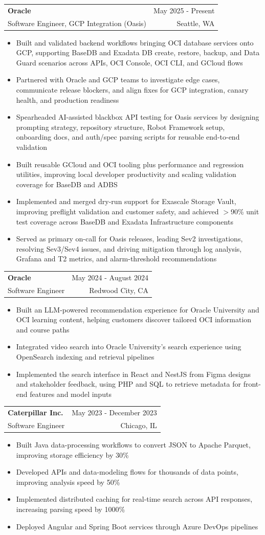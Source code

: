 \documentclass[letterpaper,11pt]{article}
\makeatletter
\newcommand{\resumeItem}[1]{
  \item\small{
    {#1 \vspace{-2pt}}
  }
}
\newcommand{\resumeSubheading}[4]{
  \vspace{-2pt}\item
    \begin{tabular*}{0.97\textwidth}[t]{l@{\extracolsep{\fill}}r}
      \textbf{#1} & #2 \\
      {\small#3} & {\small #4} \\
    \end{tabular*}\vspace{-7pt}
}
\newcommand{\resumeItemListStart}{\begin{itemize}}
\newcommand{\resumeItemListEnd}{\end{itemize}\vspace{-5pt}}
\makeatother
\begin{document}
    \resumeSubheading
  {Oracle}{May 2025 - Present}
  {Software Engineer, GCP Integration (Oasis)}{Seattle, WA}
  \resumeItemListStart
    \resumeItem{Built and validated backend workflows bringing OCI database services onto GCP, supporting BaseDB and Exadata DB create, restore, backup, and Data Guard scenarios across APIs, OCI Console, OCI CLI, and GCloud flows}
    \resumeItem{Partnered with Oracle and GCP teams to investigate edge cases, communicate release blockers, and align fixes for GCP integration, canary health, and production readiness}
    \resumeItem{Spearheaded AI-assisted blackbox API testing for Oasis services by designing prompting strategy, repository structure, Robot Framework setup, onboarding docs, and auth/spec parsing scripts for reusable end-to-end validation}
    \resumeItem{Built reusable GCloud and OCI tooling plus performance and regression utilities, improving local developer productivity and scaling validation coverage for BaseDB and ADBS}
    \resumeItem{Implemented and merged dry-run support for Exascale Storage Vault, improving preflight validation and customer safety, and achieved $>$90\% unit test coverage across BaseDB and Exadata Infrastructure components}
    \resumeItem{Served as primary on-call for Oasis releases, leading Sev2 investigations, resolving Sev3/Sev4 issues, and driving mitigation through log analysis, Grafana and T2 metrics, and alarm-threshold recommendations}
  \resumeItemListEnd

    \resumeSubheading
      {Oracle}{May 2024 - August 2024}
      {Software Engineer}{Redwood City, CA}
      \resumeItemListStart
        \resumeItem{Built an LLM-powered recommendation experience for Oracle University and OCI learning content, helping customers discover tailored OCI information and course paths}
        \resumeItem{Integrated video search into Oracle University's search experience using OpenSearch indexing and retrieval pipelines}
        \resumeItem{Implemented the search interface in React and NestJS from Figma designs and stakeholder feedback, using PHP and SQL to retrieve metadata for front-end features and model inputs}
      \resumeItemListEnd

    \resumeSubheading
      {Caterpillar Inc.}{May 2023 - December 2023}
      {Software Engineer}{Chicago, IL}
      \resumeItemListStart
        \resumeItem{Built Java data-processing workflows to convert JSON to Apache Parquet, improving storage efficiency by 30\%}
        \resumeItem{Developed APIs and data-modeling flows for thousands of data points, improving analysis speed by 50\%}
        \resumeItem{Implemented distributed caching for real-time search across API responses, increasing parsing speed by 1000\%}
        \resumeItem{Deployed Angular and Spring Boot services through Azure DevOps pipelines}
      \resumeItemListEnd
\end{document}
